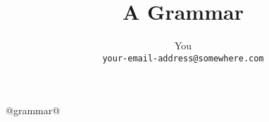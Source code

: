 \documentclass[11pt]{article}
\title{A Grammar}
\author{You\\
\texttt{your-email-address@somewhere.com}}
\newcommand{\OR}{\ | \ }
\newcommand{\AND}{\ \& \ }
\newcommand{\CS}{\mathcal{S}}
\newcommand{\Grammar}[1]{\begin{longtable}{rcll} #1 \end{longtable}}
\newcommand{\GFirst}[3]{#1 & {\tt ::=} & #2 & \textrm{#3} \\ }
\newcommand{\GNext}[2]{ & {\tt |} & #1 & \textrm{#2} \\ }
\begin{document}
\maketitle

@grammar@


\end{document}
